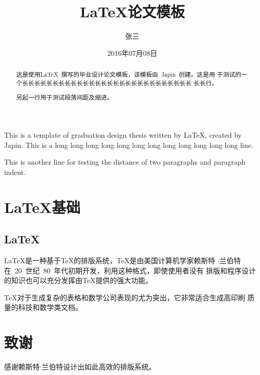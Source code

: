 \documentclass{swustthesis}
\title{\LaTeX{}论文模板}
\author{张三}
\date{2016年07月08日}
\begin{document}
\maketitle

\frontmatter

\begin{abstract}
  这是使用\LaTeX\ 撰写的毕业设计论文模板，该模板由~Japin~创建。这是用
  于测试的一个长长长长长长长长长长长长长长长长长长长长长长长长长长长长
  长长行。

  另起一行用于测试段落间距及缩进。
\end{abstract}


\begin{englishabstract}
  This is a template of graduation design thesis written by \LaTeX,
  created by Japin. This is a long long long long long long long long
  long long long long line.

  This is another line for testing the distance of two paragraphs and paragraph indent.
\end{englishabstract}


\tableofcontents

\mainmatter
\chapter{\LaTeX{}基础}
\section{\LaTeX}

\LaTeX{}是一种基于\TeX{}的排版系统，\TeX{}是由美国计算机学家赖斯特
$\cdot$兰伯特在~20~世纪~80~年代初期开发，利用这种格式，即使使用者没有
排版和程序设计的知识也可以充分发挥由\TeX{}提供的强大功能。

\TeX{}对于生成复杂的表格和数学公司表现的尤为突出，它非常适合生成高印刷
质量的科技和数学类文档。

\backmatter

\chapter{致谢}

感谢赖斯特$\cdot$兰伯特设计出如此高效的排版系统。
\end{document}
